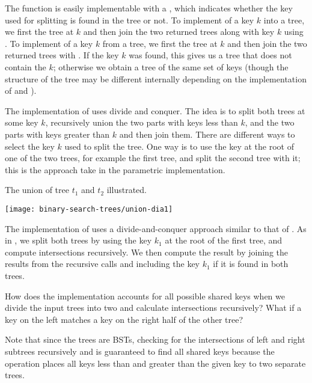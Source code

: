 \begin{chapter}



The function  is easily implementable with a
, which indicates whether the key used for splitting is
found in the tree or not.
%
To implement  of a key $k$ into a tree, we first
 the tree at $k$ and then join the two returned
trees along with key $k$ using .
%
To implement  of a key $k$ from a tree, we first
 the tree at $k$ and then join the two returned
trees with . 
%
If the key $k$ was found, this gives us a tree that does not contain
the $k$; otherwise we obtain a tree of the same set of keys (though
the structure of the tree may be different internally depending on the
implementation of  and ).

The implementation of  uses divide and conquer.  The idea is
to split both trees at some key $k$, recursively union the two parts
with keys less than $k$, and the two parts with keys greater than $k$
and then join them.  
%
There are different ways to select the key $k$ used to split the tree.
%
One way is to use the key at the root of one of the two trees, for
example the first tree, and split the second tree with it; this is the
approach take in the parametric implementation.



\begin{example}
The union of tree $t_1$ and $t_2$ illustrated.

\begin{center}
  \texttt{[image: binary-search-trees/union-dia1]}
\end{center}
\label{example:tree-union}
\end{example}


The implementation of  uses a divide-and-conquer
approach similar to that  of .  
%
As in , we split both trees by using the key $k_1$ at the
root of the first tree, and compute intersections recursively.
%
We then compute the result by joining the results from the recursive
calls and including the key $k_1$ if it is found in both trees.
%
\begin{question}
How does the implementation accounts for all possible shared keys when
we divide the input trees into two and calculate intersections
recursively?  What if a key on the left matches a key on the right
half of the other tree?
\end{question}
%
Note that since the trees are BSTs, checking for the intersections of
left and right subtrees recursively and is guaranteed to find all
shared keys because the  operation places all keys less
than and greater than the given key to two separate trees.


\end{chapter}
